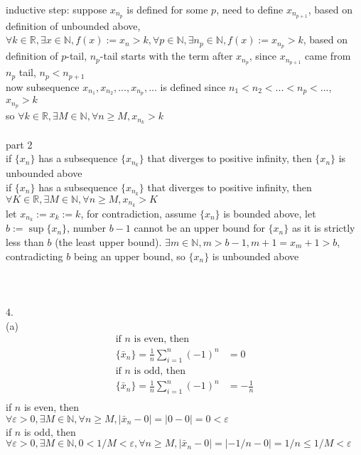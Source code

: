\documentclass[12pt, border = 4pt, multi]{article} %
\begin{document}
inductive step: suppose $x_{n_p}$ is defined for some $p$, need to define $x_{n_{p + 1}}$, based on definition of unbounded above, $\forall k \in \mathbb{R}, \exists x \in \mathbb{N}, f(x) := x_n > k, \forall p \in \mathbb{N}, \exists n_p \in \mathbb{N}, f(x) := x_{n_p} > k$, based on definition of $p$-tail, $n_p$-tail starts with the term after $x_{n_p}$, since $x_{n_{p + 1}}$ came from $n_p$ tail, $n_p < n_{p + 1}$\\
now subsequence $x_{n_1}, x_{n_2}, ..., x_{n_p}, ...$ is defined since $n_1 < n_2 < ... < n_p < ...$, $x_{n_p} > k$\\
so $\forall k \in \mathbb{R}, \exists M \in \mathbb{N}, \forall n \geq M, x_{n_k} > k$\\
\\
part 2\\
if $\{x_n\}$ has a subsequence $\{x_{n_k}\}$ that diverges to positive infinity, then $\{x_n\}$ is unbounded above\\
if $\{x_n\}$ has a subsequence $\{x_{n_k}\}$ that diverges to positive infinity, then\\ $\forall K \in \mathbb{R}, \exists M \in \mathbb{N}, \forall n \geq M, x_{n_k} > K$\\
let $x_{n_k} := x_k := k$, for contradiction, assume $\{x_n\}$ is bounded above, let $b := \sup\{x_n\}$, number $b - 1$ cannot be an upper bound for $\{x_n\}$ as it is strictly less than $b$ (the least upper bound). $\exists m \in \mathbb{N}, m > b - 1, m + 1 = x_m + 1 > b$, contradicting $b$ being an upper bound, so $\{x_n\}$ is unbounded above\\
\\
\\
\\
4.\\
(a)
\begin{align*}
\text{if } n \text{ is even, then }\\
\{\bar{x}_n\} = \frac{1}{n}\sum_{i = 1} ^ n (-1) ^ n &= 0\\
\text{if } n \text{ is odd, then }\\
\{\bar{x}_n\} = \frac{1}{n}\sum_{i = 1} ^ n (-1) ^ n &= -\frac{1}{n}\\ 
\end{align*}
if $n$ is even, then\\
$\forall \varepsilon > 0, \exists M \in \mathbb{N}, \forall n \geq M, |\bar{x}_n - 0| = |0 - 0| = 0 < \varepsilon$\\
if $n$ is odd, then\\
$\forall \varepsilon > 0, \exists M \in \mathbb{N}, 0 < 1 / M < \varepsilon, \forall n \geq M, |\bar{x}_n - 0| = |-1 / n - 0| = 1 / n \leq 1 / M < \varepsilon$\\
\end{document}
